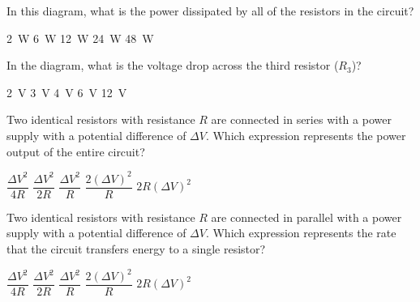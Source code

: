 \documentclass{../../../oss-ap12ibhl}
\begin{document}
\begin{questions}
  \question In this diagram, what is the power dissipated by all of the
  resistors in the circuit?
  \begin{choices}
    \choice\SI{2}{W}
    \choice\SI{6}{W}
    \choice\SI{12}{W}
    \choice\SI{24}{W}
    \choice\SI{48}{W}
  \end{choices}
  
  \question In the diagram, what is the voltage drop across the third resistor
  ($R_3$)?
  \begin{choices}
    \choice\SI{2}{V}
    \choice\SI{3}{V}
    \choice\SI{4}{V}
    \choice\SI{6}{V}
    \choice\SI{12}{V}
  \end{choices}
  \label{series4}
    
  \question Two identical resistors with resistance $R$ are connected in
  series with a power supply with a potential difference of $\Delta V$. Which
  expression represents the power output of the entire circuit?
  \begin{choices}
    \choice $\dfrac{\Delta V^2}{4R}$
    \choice $\dfrac{\Delta V^2}{2R}$
    \choice $\dfrac{\Delta V^2}{R}$
    \choice $\dfrac{2(\Delta V)^2}{R}$
    \choice $2R(\Delta V)^2$
  \end{choices}

  \question Two identical resistors with resistance $R$ are connected in
  parallel with a power supply with a potential difference of $\Delta V$.
  Which expression represents the rate that the circuit transfers energy to a
  single resistor?
  \begin{choices}
    \choice $\dfrac{\Delta V^2}{4R}$
    \choice $\dfrac{\Delta V^2}{2R}$
    \choice $\dfrac{\Delta V^2}{R}$
    \choice $\dfrac{2(\Delta V)^2}{R}$
    \choice $2R(\Delta V)^2$
  \end{choices}

    

\end{questions}
\end{document}
